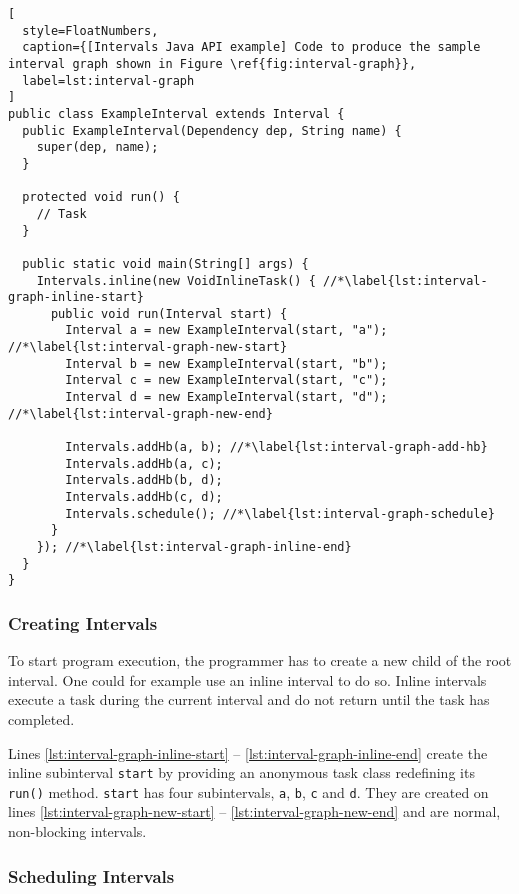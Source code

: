 \begin{lstlisting}[
  style=FloatNumbers, 
  caption={[Intervals Java API example] Code to produce the sample interval graph shown in Figure \ref{fig:interval-graph}},
  label=lst:interval-graph
]
public class ExampleInterval extends Interval {
  public ExampleInterval(Dependency dep, String name) {
    super(dep, name);
  }
  
  protected void run() {
    // Task
  }
  
  public static void main(String[] args) {
    Intervals.inline(new VoidInlineTask() { //*\label{lst:interval-graph-inline-start}
      public void run(Interval start) {
        Interval a = new ExampleInterval(start, "a"); //*\label{lst:interval-graph-new-start}
        Interval b = new ExampleInterval(start, "b");
        Interval c = new ExampleInterval(start, "c");
        Interval d = new ExampleInterval(start, "d"); //*\label{lst:interval-graph-new-end}
        
        Intervals.addHb(a, b); //*\label{lst:interval-graph-add-hb}
        Intervals.addHb(a, c);
        Intervals.addHb(b, d);
        Intervals.addHb(c, d);
        Intervals.schedule(); //*\label{lst:interval-graph-schedule}
      }
    }); //*\label{lst:interval-graph-inline-end}
  }
}
\end{lstlisting}

\subsubsection{Creating Intervals}
\label{sec:intro-intervals-creating-intervals}

To start program execution, the programmer has to create a new child
of the root interval. One could for example use an inline interval to
do so. Inline intervals execute a task during the current interval and
do not return until the task has completed.

Lines \ref{lst:interval-graph-inline-start} --
\ref{lst:interval-graph-inline-end} create the inline subinterval
\lstinline|start| by providing an anonymous task class redefining its
\lstinline|run()| method. \lstinline|start| has four subintervals,
\lstinline|a|, \lstinline|b|, \lstinline|c| and \lstinline|d|. They
are created on lines \ref{lst:interval-graph-new-start} --
\ref{lst:interval-graph-new-end} and are normal, non-blocking
intervals.

\subsubsection{Scheduling Intervals}
\label{sec:intro-intervals-scheduling-intervals}

